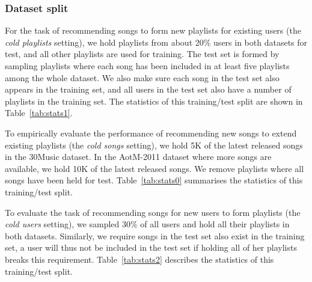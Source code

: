 \subsubsection{Dataset split}
For the task of recommending songs to form new playlists for existing users (\ie the \emph{cold playlists} setting),
we hold playlists from about 20\% users in both datasets for test, and all other playlists are used for training.
The test set is formed by sampling playlists where each song has been included in at least five playlists among the whole dataset.
We also make sure each song in the test set also appears in the training set,
and all users in the test set also have a number of playlists in the training set.
The statistics of this training/test split are shown in Table~\ref{tab:stats1}.

To empirically evaluate the performance of recommending new songs to extend existing playlists (\ie the \emph{cold songs} setting),
we hold 5K of the latest released songs in the 30Music dataset. 
In the AotM-2011 dataset where more songs are available, we hold 10K of the latest released songs.
We remove playlists where all songs have been held for test. %
Table~\ref{tab:stats0} summarises the statistics of this training/test split.

To evaluate the task of recommending songs for new users to form playlists (\ie the \emph{cold users} setting),
we sampled 30\% of all users and hold all their playlists in both datasets.
Similarly, we require songs in the test set also exist in the training set,
a user will thus not be included in the test set if holding all of her playlists breaks this requirement.
Table~\ref{tab:stats2} describes the statistics of this training/test split.



%


